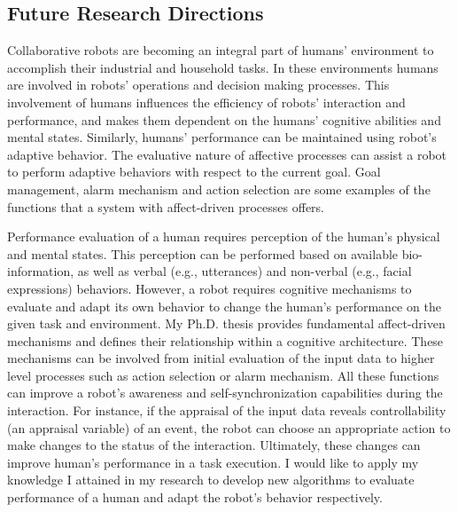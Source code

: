 \documentclass[a4paper, 11pt]{article}
\begin{document}
\begin{small}
\section*{Future Research Directions}

Collaborative robots are becoming an integral part of humans' environment to
accomplish their industrial and household tasks. In these environments humans
are involved in robots' operations and decision making processes. This
involvement of humans influences the efficiency of robots' interaction and
performance, and makes them dependent on the humans' cognitive abilities and
mental states. Similarly, humans' performance can be maintained using robot's
adaptive behavior. The evaluative nature of affective processes can assist a
robot to perform adaptive behaviors with respect to the current goal. Goal
management, alarm mechanism and action selection are some examples of the
functions that a system with affect-driven processes offers.

Performance evaluation of a human requires perception of the human's physical
and mental states. This perception can be performed based on available
bio-information, as well as verbal (e.g., utterances) and non-verbal (e.g.,
facial expressions) behaviors. However, a robot requires cognitive mechanisms to
evaluate and adapt its own behavior to change the human's performance on the
given task and environment. My Ph.D. thesis provides fundamental affect-driven
mechanisms and defines their relationship within a cognitive architecture. These
mechanisms can be involved from initial evaluation of the input data to higher
level processes such as action selection or alarm mechanism. All these functions
can improve a robot's awareness and self-synchronization capabilities during the
interaction. For instance, if the appraisal of the input data reveals
controllability (an appraisal variable) of an event, the robot can choose an
appropriate action to make changes to the status of the interaction. Ultimately,
these changes can improve human's performance in a task execution. I would like
to apply my knowledge I attained in my research to develop new algorithms to
evaluate performance of a human and adapt the robot's behavior respectively.






\vspace{0.5cm}

\end{small}
\end{document}
